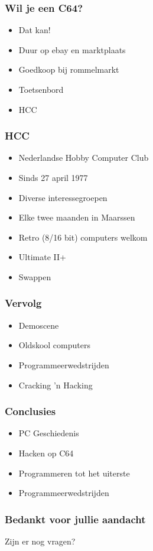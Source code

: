\documentclass[aspectratio=43]{uva-inf-presentation}
\begin{document}
\begin{frame}
\frametitle{Wil je een C64?}

\begin{itemize}
\item Dat kan!
\item Duur op ebay en marktplaats
\item Goedkoop bij rommelmarkt
\item Toetsenbord
\item HCC
\end{itemize}

\end{frame}


\begin{frame}
\frametitle{HCC}

\begin{itemize}
\item Nederlandse Hobby Computer Club
\item Sinds 27 april 1977
\item Diverse interessegroepen
\item Elke twee maanden in Maarssen
\item Retro (8/16 bit) computers welkom
\item Ultimate II+
\item Swappen
\end{itemize}

\end{frame}


\begin{frame}
\frametitle{Vervolg}

\begin{itemize}
\item Demoscene
\item Oldskool computers
\item Programmeerwedstrijden
\item Cracking 'n Hacking
\end{itemize}

\end{frame}


\begin{frame}
\frametitle{Conclusies}

\begin{itemize}
\item PC Geschiedenis
\item Hacken op C64
\item Programmeren tot het uiterste
\item Programmeerwedstrijden
\end{itemize}

\end{frame}





\begin{frame}
\frametitle{Bedankt voor jullie aandacht}
\Large{\centerline{Zijn er nog vragen?}}
\end{frame}
\end{document}
